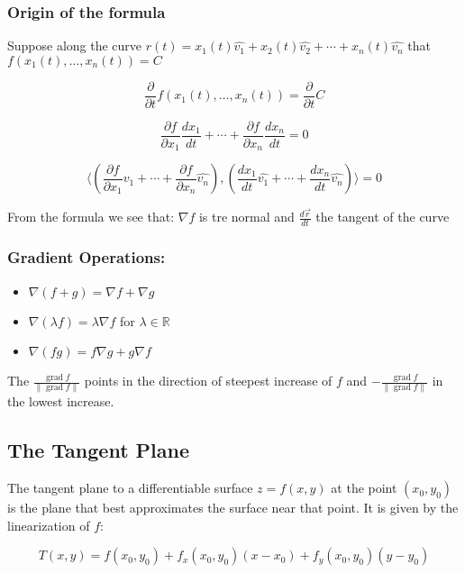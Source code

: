 \subsubsection*{Origin of the formula}

Suppose along the curve \(r(t) = x_1(t)\hat{v_1} + x_2(t)\hat{v_2} + \cdots + x_n(t)\hat{v_n}\) that \(f(x_1(t), \dots, x_n(t)) = C\)

\[
\frac{\partial}{\partial t}f(x_1(t), \dots, x_n(t)) = \frac{\partial}{\partial t}C
\]

\[
\frac{\partial f}{\partial x_1}\frac{dx_1}{dt} + \cdots + \frac{\partial f}{\partial x_n}\frac{dx_n}{dt} = 0
\]

\[
\langle \left(\frac{\partial f}{\partial x_1}\hat{v_1} + \cdots + \frac{\partial f}{\partial x_n}\hat{v_n}\right) , \left( \frac{dx_1}{dt}\hat{v_1} + \cdots + \frac{dx_n}{dt}\hat{v_n}\right)\rangle = 0
\]

From the formula we see that: \(\nabla f\) is tre normal and \(\frac{d\vec{r}}{dt}\) the tangent of the curve

\QED

\subsubsection{Gradient Operations:}
\begin{itemize}[label=\(-\)]
\item \( \nabla(f + g) = \nabla f + \nabla g \)
\item \( \nabla(\lambda f) = \lambda \nabla f \) for \( \lambda \in \mathbb{R} \)
\item \( \nabla(fg) = f \nabla g + g \nabla f \)
\end{itemize}

The \(\frac{\operatorname{grad}f}{\|\operatorname{grad}f\|}\) points in the direction of steepest increase of \( f \) and
 \(- \frac{\operatorname{grad}f}{\|\operatorname{grad}f\|}\) in the lowest increase.



\subsection{The Tangent Plane}

The tangent plane to a differentiable surface \( z = f(x, y) \) at the point \( (x_0, y_0) \) is the plane that best approximates the surface near that point. It is given by the linearization of \( f \):

\[
T(x, y) = f(x_0, y_0) + f_x(x_0, y_0)(x - x_0) + f_y(x_0, y_0)(y - y_0)
\]

